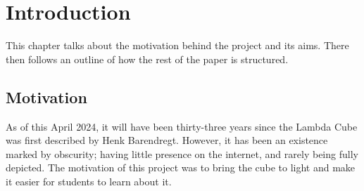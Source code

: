 \documentclass{l4proj}
\begin{document}
%
%
%
%
%
%
%
%
\chapter{Introduction}


This chapter talks about the motivation behind the project and its aims.  There then follows an outline of how the rest of the paper is structured.

\section{Motivation}

As of this April 2024, it will have been thirty-three years since the Lambda Cube was first described by Henk Barendregt.  However, it has been an existence marked by obscurity; having little presence on the internet, and rarely being fully depicted.  The motivation of this project was to bring the cube to light and make it easier for students to learn about it.
\end{document}
